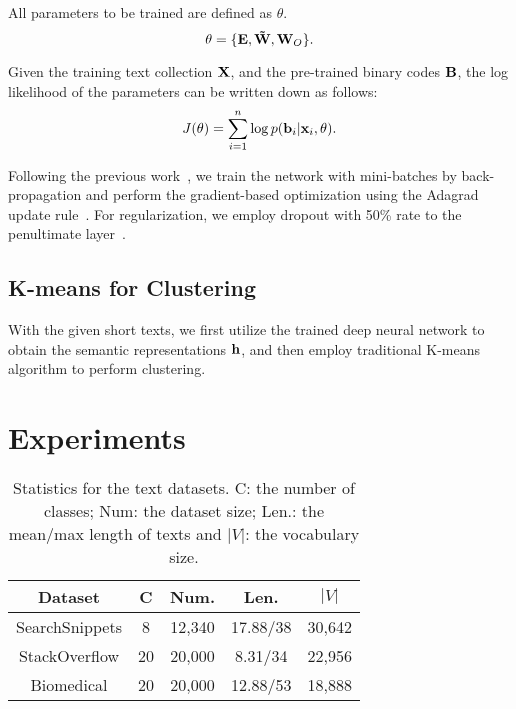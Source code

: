 \documentclass[review]{elsarticle}
\begin{document}
All parameters to be trained are defined as \(\theta \).
\begin{equation}
\theta  = \{ {\bf{E}},{\bf{\tilde W}},{{\bf{W}}_O}\}.
\label{eq:theta}
\end{equation}

Given the training text collection \({\bf{X}}\), and the pre-trained binary codes \({\bf{B}}\), the log likelihood of the parameters can be written down as follows:
\begin{equation}
{J({\bf{\theta }})} = \sum\limits_{i = 1}^n {\log p({{\bf{b}}_i}|{{\bf{x}}_i},{\bf{\theta }})}.
\label{eq:likelihood}
\end{equation}

Following the previous work~\cite{16_blunsom2014convolutional}, we train the network with mini-batches by back-propagation and perform the gradient-based optimization using the Adagrad update rule~\cite{36_duchi2011adaptive}. For regularization, we employ dropout with 50\% rate to the penultimate layer~\cite{16_blunsom2014convolutional,22_kim2014convolutional}.

\subsection{K-means for Clustering}
With the given short texts, we first utilize the trained deep neural network to obtain the semantic representations \({\bf{h}}\), and then employ traditional K-means algorithm to perform clustering.

\section{Experiments}
\label{sec:Experiments}

\begin{table}[t] %
\begin{center}
\begin{tabular}{|c|c|c|c|c|}\hline
Dataset&C &Num. &Len. &$|V|$\\\hline \hline
SearchSnippets   &	8    &	12,340     &	17.88/38  &	30,642       \\
StackOverflow     &	20    &	20,000     &	8.31/34  &	22,956       \\
Biomedical     &	20    &	20,000     &	 12.88/53 &	18,888       \\\hline
\end{tabular}
\end{center}
\caption{\label{tb:Datasets} Statistics for the text datasets. C: the number of classes; Num: the dataset size; Len.: the mean/max length of texts and $|V|$: the vocabulary size.}
\end{table}
\end{document}
